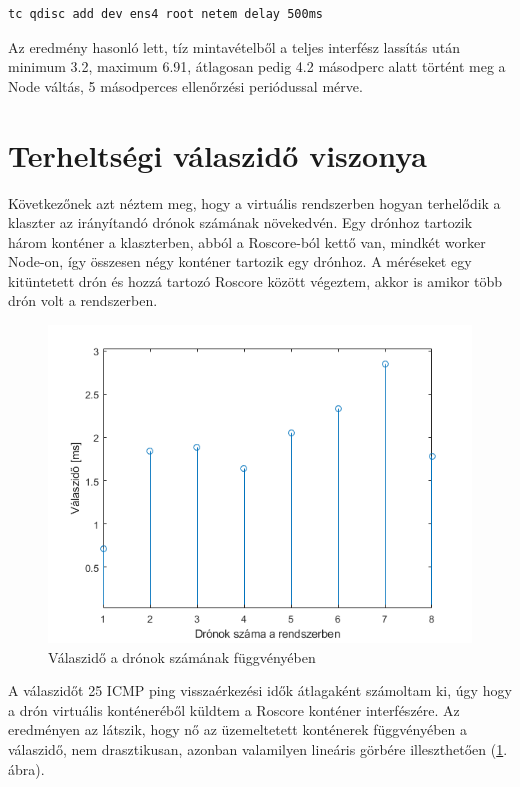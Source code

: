 \begin{lstlisting}[caption={Késleltetés hozzáadása a worker Node külső interfészéhez alapértelmezett Linux programmal}, label={lst:tc}]
tc qdisc add dev ens4 root netem delay 500ms
\end{lstlisting}

\noindent
Az eredmény hasonló lett, tíz mintavételből a teljes interfész lassítás után minimum 3.2, maximum 6.91, átlagosan pedig 4.2 másodperc alatt történt meg a Node váltás, 5 másodperces ellenőrzési periódussal mérve.

\section{Terheltségi válaszidő viszonya}
Következőnek azt néztem meg, hogy a virtuális rendszerben hogyan terhelődik a klaszter az irányítandó drónok számának növekedvén. Egy drónhoz tartozik három konténer a klaszterben, abból a Roscore-ból kettő van, mindkét worker Node-on, így összesen négy konténer tartozik egy drónhoz. A méréseket egy kitüntetett drón és hozzá tartozó Roscore között végeztem, akkor is amikor több drón volt a rendszerben.\\

\begin{figure}
	\centering
	\includegraphics{figures/meres_ping.png}
	\caption{Válaszidő a drónok számának függvényében}
	\label{fig:meresping}
\end{figure}

\noindent
A válaszidőt 25 ICMP ping visszaérkezési idők átlagaként számoltam ki, úgy hogy a drón virtuális konténeréből küldtem a Roscore konténer interfészére. Az eredményen az látszik, hogy nő az üzemeltetett konténerek függvényében a válaszidő, nem drasztikusan, azonban valamilyen lineáris görbére illeszthetően (\ref{fig:meresping}. ábra).  \\

